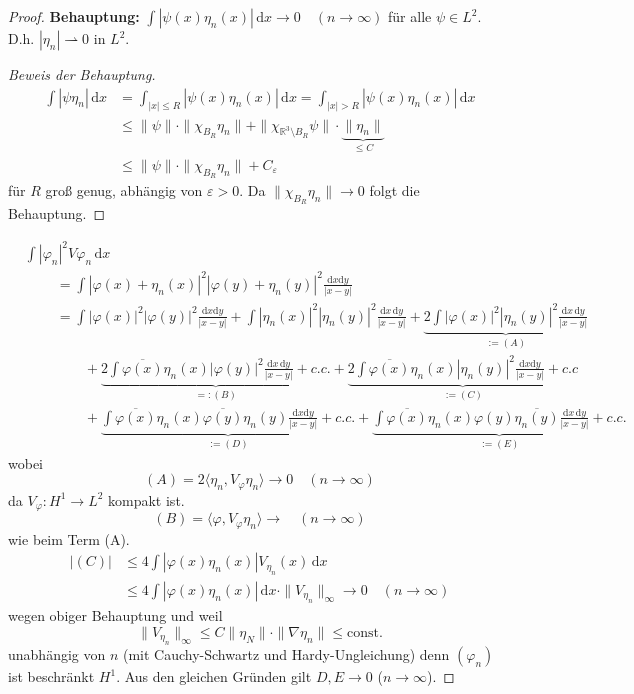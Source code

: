 \documentclass[
paper=a4,
bibtotocnumbered,
liststotocnumbered,
tablecaptionabove,
pointlessnumbers,
twoside,
openright,
10pt
]
{report}
\let\phi\varphi
\theoremstyle{definition}
\numberwithin{equation}{chapter}
\begin{document}
\begin{proof}
\textbf{Behauptung:} $\int |\psi(x) \eta_n(x) | \, \mathrm dx \to 0\quad (n\to \infty)$ für alle $\psi \in L^2$. D.h. $|\eta_n|\rightharpoonup 0$ in $L^2$.
\begin{proof}[Beweis der Behauptung]
\begin{align*}
\int |\psi \eta_n|\, \mathrm dx &= \int_{|x|\le R} |\psi(x) \eta_n(x)|\, \mathrm dx = \int_{|x|>R} |\psi(x) \eta_n(x) | \, \mathrm dx \\
&\le \| \psi\| \cdot \| \chi_{B_R} \eta_n\| + \| \chi_{\mathbb R^3\setminus B_R} \psi\| \cdot \underbrace{\| \eta_n\|}_{\le C} \\
&\le \| \psi\| \cdot \| \chi_{B_R} \eta_n\| + C_\varepsilon
\end{align*}
für $R$ groß genug, abhängig von $\varepsilon >0$. Da $\| \chi_{B_R} \eta_n\| \to 0$ folgt die Behauptung.
\end{proof}
\begin{align*}
&\int |\phi_n|^2 V\phi_n \, \mathrm dx\\
&\ \qquad= \int |\phi(x) + \eta_n(x)|^2|\phi(y) + \eta_n(y)|^2 \frac{\mathrm dx \mathrm dy}{|x-y|}\\
&\ \qquad= \int |\phi(x)|^2 |\phi(y)|^2 \frac{\mathrm dx \mathrm dy}{|x-y|}+ \int |\eta_n(x)|^2 |\eta_n(y)|^2\frac{\mathrm dx\, \mathrm dy}{|x-y|} + \underbrace{2\int |\phi(x)|^2 |\eta_n(y)|^2 \frac{\mathrm dx \, \mathrm dy}{|x-y|}}_{:=(A)}\\
&\ \qquad \qquad + \underbrace{2\int \overline{\phi(x)} \eta_n(x) |\phi(y)|^2 \frac{\mathrm dx \, \mathrm dy}{|x-y|} + c.c.}_{=:(B)}
+ \underbrace{2\int \overline{\phi(x)} \eta_n(x) |\eta_n(y)|^2 \frac{\mathrm dx \mathrm dy}{|x-y|} + c.c}_{:=(C)} \\
&\ \qquad \qquad + \underbrace{\int \overline{\phi(x)} \eta_n(x) \overline{\phi(y)} \eta_n(y) \frac{\mathrm dx \mathrm dy}{|x-y|} + c.c.}_{:=(D)}+ \underbrace{\int \overline{\phi(x)} \eta_n(x) \phi(y) \overline{\eta_n(y)} \frac{\mathrm dx \, \mathrm dy}{|x-y|} + c.c.}_{:=(E)}
\end{align*}
wobei $$(A)= 2 \langle \eta_n, V_\phi \eta_n\rangle \to 0 \quad (n\to \infty)$$
da $V_\phi: H^1 \to L^2$ kompakt ist.
\begin{equation}
(B)= \langle \phi, V_{\phi} \eta_n \rangle \to \quad (n\to \infty)
\end{equation}
wie beim Term (A).
\begin{align*}
|(C)| &\le 4 \int |\phi(x) \eta_n(x)| V_{\eta_n} (x) \, \mathrm dx \\
&\le 4 \int |\phi(x) \eta_n(x) |\, \mathrm dx\cdot \| V_{\eta_n} \|_\infty \to 0 \quad (n\to \infty)
\end{align*}
wegen obiger Behauptung und weil $$\|V_{\eta_n}\|_\infty \le C \| \eta_N \| \cdot \| \nabla \eta_n\|  \le \text{const.}
$$
unabhängig von $n$ (mit Cauchy-Schwartz und Hardy-Ungleichung)
denn $(\phi_n)$ ist beschränkt $H^1$. Aus den gleichen Gründen gilt $D, E \to 0$ ($n\to \infty$).
\end{proof}
\end{document}
